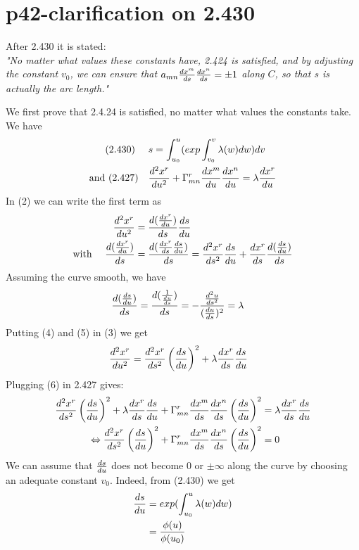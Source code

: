 \section{p42-clarification on 2.430}
\begin{tcolorbox}
After 2.430 it is stated:\\
\it{"No matter what values these constants have, 2.424 is satisfied, and by adjusting the constant $v_0$, we can ensure that $a_{mn}\dv{x^m}{s}\dv{x^n}{s} = \pm1$ along $C$, so that $s$ is actually the arc length."}
\end{tcolorbox}
We first prove that 2.4.24 is satisfied, no matter what values the constants take. We have
\begin{align}
\text{(2.430) } \quad  &s =\int_{u_0}^u(exp\int_{v_0}^v \lambda (w)dw)dv\\
\text{and (2.427)} \quad &\dv[2]{x^r}{u} + \Gamma^r_{mn}\dv{x^m}{u}\dv{x^n}{u} =  \lambda \dv{x^r}{u}
\end{align}
In (2) we can write the first term as
\begin{align}
\quad \dv[2]{x^r}{u} &= \dv{(\dv{x^r}{u})}{s}\dv{s}{u} \\
\text{with } \quad \dv{(\dv{x^r}{u})}{s} &=  \dv{(\dv{x^r}{s}\dv{s}{u})}{s} = \dv[2]{x^r}{s}\dv{s}{u}+\dv{x^r}{s}\dv{(\dv{s}{u})}{s} 
\end{align}
Assuming the curve smooth, we have
\begin{align}
\dv{(\dv{s}{u})}{s} & = \dv{(\frac{1}{\dv{u}{s}})}{s} = -\frac{\dv[2]{u}{s}}{(\dv{u}{s})^2}= \lambda
\end{align}
Putting (4) and (5) in (3) we get
\begin{align}
\dv[2]{x^r}{u} &= \dv[2]{x^r}{s} \left ( \dv{s}{u}\right )^2 + \lambda\dv{x^r}{s}\dv{s}{u}
\end{align}
Plugging (6) in 2.427 gives:
\begin{align}
\dv[2]{x^r}{s} \left (\dv{s}{u}\right )^2 + \lambda\dv{x^r}{s}\dv{s}{u} +\Gamma^r_{mn}\dv{x^m}{s}\dv{x^n}{s}\left (\dv{s}{u}\right )^2  &=  \lambda \dv{x^r}{s}\dv{s}{u}\\
\Leftrightarrow \dv[2]{x^r}{s} \left (\dv{s}{u}\right )^2 +\Gamma^r_{mn}\dv{x^m}{s}\dv{x^n}{s}\left (\dv{s}{u}\right )^2  &=  0
\end{align}
We can assume that $\dv{s}{u} $ does not become $0$ or $\pm \infty$ along the curve by choosing an adequate constant $v_0$. Indeed, from (2.430) we get
\begin{align}
\dv{s}{u}  &= exp(\int_{u_0}^u \lambda (w)dw)\\
\ &= \frac{\phi (u)}{\phi (u_0)}
\end{align}
